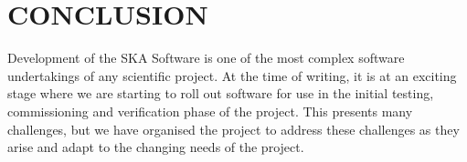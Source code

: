 \documentclass[a4paper,
               biblatex,     %
               keeplastbox,   %
               ]{jacow}
\begin{document}







\section{CONCLUSION}
Development of the SKA Software is one of the most complex software undertakings of any scientific project. At the time of writing, it is at an exciting stage where we are  starting to roll out software for use in the initial testing, commissioning and verification phase of the project. This presents many challenges, but we have organised the project to address these challenges as they arise and adapt to the changing needs of the project. 
\end{document}
